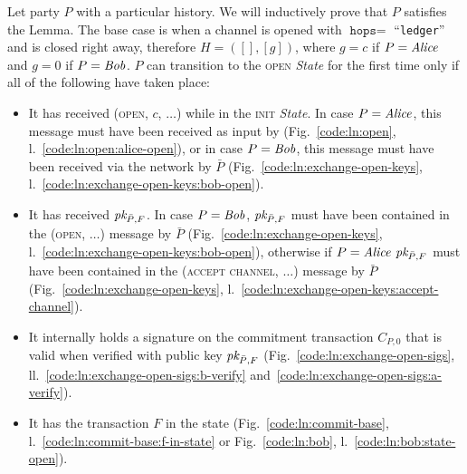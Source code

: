   Let party $P$ with a particular history. We will inductively prove that $P$
  satisfies the Lemma. The base case is when a channel is opened with
  $\texttt{hops} =$ ``\texttt{ledger}'' and is closed right away, therefore $H =
  ([], [g])$, where $g = c$ if $P = \mathit{Alice}$ and $g = 0$ if $P = \mathit{Bob}$.  $P$ can
  transition to the \textsc{open} \textit{State} for the first time only if all
  of the following have taken place:
  \begin{itemize}
    \item It has received (\textsc{open}, $c$, $\dots$) while in the
    \textsc{init} \textit{State}. In case $P = \mathit{Alice}$, this message must have
    been received as input by \environment (Fig.~\ref{code:ln:open},
    l.~\ref{code:ln:open:alice-open}), or in case $P = \mathit{Bob}$, this message must
    have been received via the network by $\bar{P}$
    (Fig.~\ref{code:ln:exchange-open-keys},
    l.~\ref{code:ln:exchange-open-keys:bob-open}).
    \item It has received $\textit{pk}_{\bar{P}, F}$. In case $P = \mathit{Bob}$, $\textit{pk}_{\bar{P},
    F}$ must have been contained in the (\textsc{open}, $\dots$) message by
    $\bar{P}$ (Fig.~\ref{code:ln:exchange-open-keys},
    l.~\ref{code:ln:exchange-open-keys:bob-open}), otherwise if $P = \mathit{Alice}$
    $\textit{pk}_{\bar{P}, F}$ must have been contained in the (\textsc{accept channel},
    $\dots$) message by $\bar{P}$ (Fig.~\ref{code:ln:exchange-open-keys},
    l.~\ref{code:ln:exchange-open-keys:accept-channel}).
    \item It internally holds a signature on the commitment transaction $C_{P,
    0}$ that is valid when verified with public key $\textit{pk}_{\bar{P}, F}$
    (Fig.~\ref{code:ln:exchange-open-sigs},
    ll.~\ref{code:ln:exchange-open-sigs:b-verify}
    and~\ref{code:ln:exchange-open-sigs:a-verify}).
    \item It has the transaction $F$ in the \ledger state
    (Fig.~\ref{code:ln:commit-base}, l.~\ref{code:ln:commit-base:f-in-state} or
    Fig.~\ref{code:ln:bob}, l.~\ref{code:ln:bob:state-open}).
  \end{itemize}

